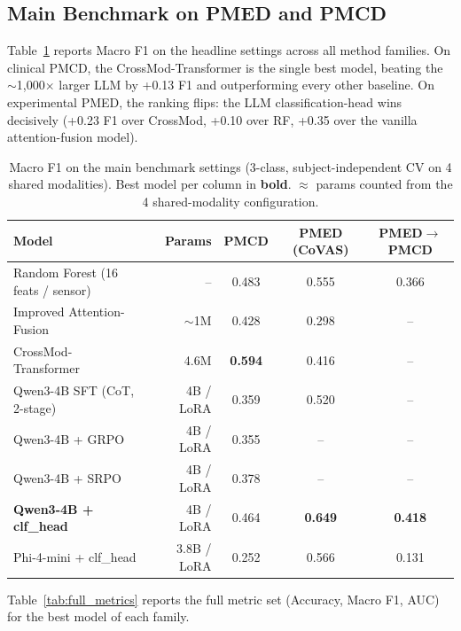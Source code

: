 \documentclass{article}
\begin{document}
\subsection{Main Benchmark on PMED and PMCD}

Table~\ref{tab:main_results} reports Macro F1 on the headline settings across all method families. On clinical PMCD, the CrossMod-Transformer is the single best model, beating the $\sim$1{,}000$\times$ larger LLM by +0.13 F1 and outperforming every other baseline. On experimental PMED, the ranking flips: the LLM classification-head wins decisively (+0.23 F1 over CrossMod, +0.10 over RF, +0.35 over the vanilla attention-fusion model).

\begin{table}[t]
\centering
\caption{Macro F1 on the main benchmark settings (3-class, subject-independent CV on 4 shared modalities). Best model per column in \textbf{bold}. $\approx$ params counted from the 4 shared-modality configuration.}
\label{tab:main_results}
\small
\begin{tabular}{@{}lrccc@{}}
\toprule
\textbf{Model} & \textbf{Params} & \textbf{PMCD} & \textbf{PMED (CoVAS)} & \textbf{PMED$\to$PMCD} \\
\midrule
Random Forest (16 feats / sensor)                          & --     & 0.483 & 0.555 & 0.366 \\
Improved Attention-Fusion                                  & $\sim$1M   & 0.428 & 0.298 & -- \\
CrossMod-Transformer~\citep{farmani2025crossmod}           & 4.6M   & \textbf{0.594} & 0.416 & -- \\
Qwen3-4B SFT (CoT, 2-stage)                                & 4B / LoRA & 0.359 & 0.520 & -- \\
Qwen3-4B + GRPO                                            & 4B / LoRA & 0.355 & --    & -- \\
Qwen3-4B + SRPO                                            & 4B / LoRA & 0.378 & --    & -- \\
\textbf{Qwen3-4B + clf\_head}                              & 4B / LoRA & 0.464 & \textbf{0.649} & \textbf{0.418} \\
Phi-4-mini + clf\_head                                     & 3.8B / LoRA & 0.252 & 0.566 & 0.131 \\
\bottomrule
\end{tabular}
\end{table}

Table~\ref{tab:full_metrics} reports the full metric set (Accuracy, Macro F1, AUC) for the best model of each family.
\end{document}
